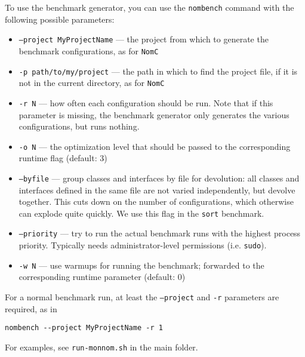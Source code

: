 \documentclass{article}
\begin{document}
To use the benchmark generator, you can use the \texttt{nombench} command with the following possible parameters:
\begin{itemize}
\item \texttt{--project MyProjectName} --- the project from which to generate the benchmark configurations, as for \texttt{NomC}
\item \texttt{-p path/to/my/project} --- the path in which to find the project file, if it is not in the current directory, as for \texttt{NomC}
\item \texttt{-r N} --- how often each configuration should be run. Note that if this parameter is missing, the benchmark generator only generates the various configurations, but runs nothing.
\item \texttt{-o N} --- the optimization level that should be passed to the corresponding runtime flag (default: 3)
\item \texttt{--byfile} --- group classes and interfaces by file for devolution: all classes and interfaces defined in the same file are not varied independently, but devolve together.
This cuts down on the number of configurations, which otherwise can explode quite quickly.
We use this flag in the \texttt{sort} benchmark.
\item \texttt{--priority} --- try to run the actual benchmark runs with the highest process priority.
Typically needs administrator-level permissions (i.e. \texttt{sudo}).
\item \texttt{-w N} --- use warmups for running the benchmark; forwarded to the corresponding runtime parameter (default: 0)
\end{itemize}

For a normal benchmark run, at least the \texttt{--project} and \texttt{-r} parameters are required, as in
\begin{verbatim}
nombench --project MyProjectName -r 1
\end{verbatim}
For examples, see \texttt{run-monnom.sh} in the main folder.
\end{document}
